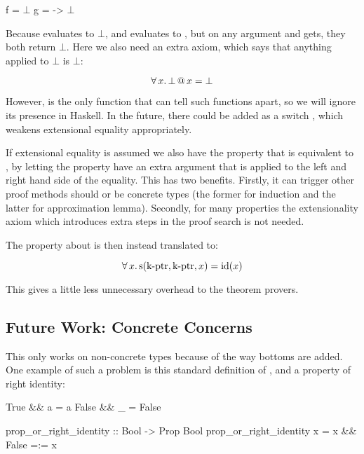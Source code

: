 \begin{code}[mathescape]
f = $\bot$
g = \x -> $\bot$
\end{code}

Because  evaluates to $\bot$, and  evaluates
to \hs{()}, but on any argument  and  gets, they both
return $\bot$. Here we also need an extra axiom, which says that
anything applied to $\bot$ is $\bot$:

\begin{equation*}
\forall \, x . \, \bot \, @ \, x = \bot
\end{equation*}

However,  is the only function that can tell such functions
apart, so we will ignore its presence in Haskell.  In the future,
there could be added as a switch , which weakens
extensional equality appropriately.

If extensional equality is assumed we also have the property that
 is equivalent to , by letting the
property have an extra argument that is applied to the left and right
hand side of the equality. This has two benefits. Firstly, it can
trigger other proof methods should  or  be concrete types
(the former for induction and the latter for approximation
lemma). Secondly, for many properties the extensionality axiom which
introduces extra steps in the proof search is not needed.

The property about  is then instead translated to:

\begin{equation*}
\forall \, x . \, \mathrm{s}(\mathrm{\operatorname{k-ptr}},\mathrm{\operatorname{k-ptr}},x) = \mathrm{id}(x)
\end{equation*}

This gives a little less unnecessary overhead to the theorem provers.

\subsection{Future Work: Concrete Concerns}
\label{sec:concreteconcerns}

This only works on non-concrete types because of the way bottoms are
added. One example of such a problem is this standard definition of
\hs{\&\&}, and a property of right identity:

\begin{code}
True  && a = a
False && _ = False

prop_or_right_identity :: Bool -> Prop Bool
prop_or_right_identity x = x && False =:= x
\end{code}

